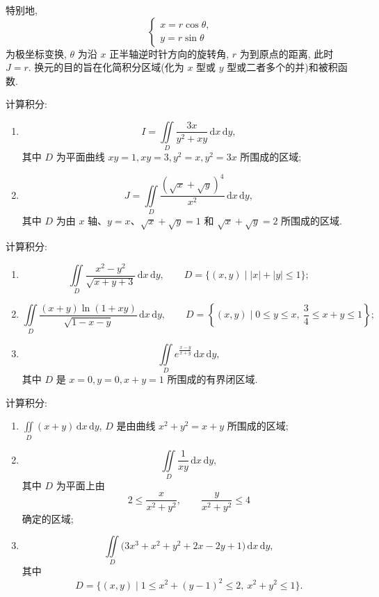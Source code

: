 \documentclass[../../数学分析培优讲义.tex]{subfiles}
\begin{document}
\begin{remark}
特别地,
\[
    \begin{cases}
        x=r\cos\theta,\\
        y=r\sin\theta
    \end{cases}
\]
为极坐标变换, $\theta$ 为沿 $x$ 正半轴逆时针方向的旋转角, $r$ 为到原点的距离, 此时 $J=r$. 换元的目的旨在化简积分区域(化为 $x$ 型或 $y$ 型或二者多个的并)和被积函数.
\end{remark}

\begin{example}
计算积分:
\begin{enumerate}[label=(\arabic*)]
    \item
    \[
        I=\iint\limits_D\dfrac{3x}{y^2+xy}\,\mathrm{d}x\,\mathrm{d}y,
    \]
    其中 $D$ 为平面曲线 $xy=1,xy=3,y^2=x,y^2=3x$ 所围成的区域;
    \item
    \[
        J=\iint\limits_D\dfrac{(\sqrt{x}+\sqrt{y})^4}{x^2}\,\mathrm{d}x\,\mathrm{d}y,
    \]
    其中 $D$ 为由 $x$ 轴、$y=x$、$\sqrt{x}+\sqrt{y}=1$ 和 $\sqrt{x}+\sqrt{y}=2$ 所围成的区域.
\end{enumerate}
\end{example}
\exampleblank

\begin{example}
计算积分:
\begin{enumerate}[label=(\arabic*)]
    \item
    \[
        \iint\limits_D\dfrac{x^2-y^2}{\sqrt{x+y+3}}\,\mathrm{d}x\,\mathrm{d}y,
        \qquad D=\{(x,y)\mid |x|+|y|\leq1\};
    \]
    \item
    \[
        \iint\limits_D\dfrac{(x+y)\ln(1+xy)}{\sqrt{1-x-y}}\,\mathrm{d}x\,\mathrm{d}y,
        \qquad D=\left\{(x,y)\mid0\leq y\leq x,\ \dfrac{3}{4}\leq x+y\leq1\right\};
    \]
    \item
    \[
        \iint\limits_De^{\frac{x-y}{x+y}}\,\mathrm{d}x\,\mathrm{d}y,
    \]
    其中 $D$ 是 $x=0,y=0,x+y=1$ 所围成的有界闭区域.
\end{enumerate}
\end{example}
\exampleblank

\begin{example}
计算积分:
\begin{enumerate}[label=(\arabic*)]
    \item $\displaystyle\iint\limits_D(x+y)\,\mathrm{d}x\,\mathrm{d}y$, $D$ 是由曲线 $x^2+y^2=x+y$ 所围成的区域;
    \item
    \[
        \iint\limits_D\dfrac{1}{xy}\,\mathrm{d}x\,\mathrm{d}y,
    \]
    其中 $D$ 为平面上由
    \[
        2\leq\dfrac{x}{x^2+y^2},\qquad
        \dfrac{y}{x^2+y^2}\leq4
    \]
    确定的区域;
    \item
    \[
        \iint\limits_D\bigl(3x^3+x^2+y^2+2x-2y+1\bigr)\,\mathrm{d}x\,\mathrm{d}y,
    \]
    其中
    \[
        D=\{(x,y)\mid1\leq x^2+(y-1)^2\leq2,\ x^2+y^2\leq1\}.
    \]
\end{enumerate}
\end{example}
\exampleblank
\end{document}
